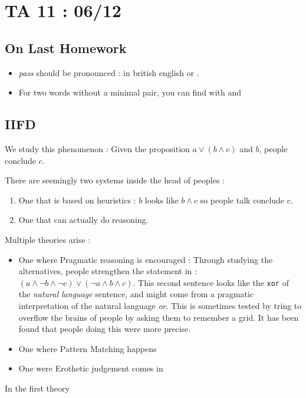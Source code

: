 \documentclass{cours}
\begin{document}
\section{TA 11\! : 06/12}
\subsection{On Last Homework}
\begin{itemize}
    \item \textsl{pass} should be pronounced : \textipa{[p\super{h}A:s]} in british english or \textipa{[p\super{h}\ae s]}.
    \item For two words without a minimal pair, you can find with \textipa{[Z]} and \textipa{[t]}
\end{itemize}
\subsection{IIFD}
We study this phenomenon : Given the proposition $a \lor \left(b \land c\right)$ and $b$, people conclude $c$.


There are seemingly two systems inside the head of peoples : 
\begin{enumerate}
    \item One that is based on heuristics : $b$ looks like $b \land c$ so people talk conclude $c$.
    \item One that can actually do reasoning. 
\end{enumerate}

Multiple theories arise : 
\begin{itemize}
    \item One where Pragmatic reasoning is encouraged : 
    Through studying the alternatives, people strengthen the statement in : $\left(a \land \lnot b \land \lnot c\right) \lor \left(\lnot a\land b \land c\right)$. This second sentence looks like the \texttt{xor} of the \textit{natural language} sentence, and might come from a pragmatic interpretation of the natural language \textsl{or}.  This is sometimes tested by tring to overflow the brains of people by asking them to remember a grid. It has been found that people doing this were more precise. 
    \item One where Pattern Matching happens
    \item One were Erothetic judgement comes in
\end{itemize}

In the first theory
\end{document}
